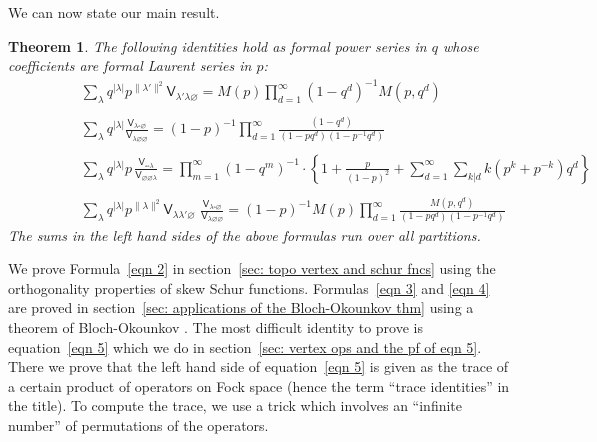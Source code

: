 \documentclass[12pt]{amsart}
\newcommand{\Vsf}{\mathsf{V}}
\newcommand{\bx}{\square}
\renewcommand{\emptyset}{\varnothing}
\newtheorem{theorem}{Theorem}%
\theoremstyle{definition}
\begin{document}
We can now state our main result.

\begin{theorem}\label{thm: main formulas}
The following identities hold as formal power series in $q$ whose
coefficients are formal Laurent series in $p$:
\begin{align}
&\sum_{\lambda} q^{|\lambda |} p^{\| \lambda' \| ^{2}} \Vsf_{\lambda'
\lambda \emptyset }=  M(p) \prod_{d=1}^{\infty} (1-q^{d})^{-1}M(p,q^{d})\label{eqn 2}\\
\quad\nonumber \\
&\sum_{\lambda} q^{|\lambda |}\frac{\Vsf_{\lambda
\bx\emptyset}}{\Vsf_{\lambda \emptyset \emptyset}} =
(1-p)^{-1}\prod_{d=1}^{\infty} \frac{(1-q^{d})}{(1-pq^{d})(1-p^{-1}q^{d})}\label{eqn 3}\\
\quad\nonumber \\
&\sum_{\lambda} q^{|\lambda |} p \, \frac{\Vsf_{\bx \bx 
\lambda}}{\Vsf_{\emptyset \emptyset \lambda}} =
\prod_{m=1}^{\infty}(1-q^{m})^{-1}\cdot \left\{
1+\frac{p}{(1-p)^{2}}+\sum_{d=1}^{\infty}\sum_{k|d}k(p^{k}+p^{-k})q^{d}\right\}\label{eqn 4}\\
\quad&\quad \nonumber \\
\quad \quad \quad \quad &\sum_{\lambda} q^{|\lambda |} p^{\| \lambda \| ^{2}}
\Vsf_{\lambda \lambda' \emptyset} \,\,\frac{\Vsf_{\lambda \bx \emptyset}}{\Vsf_{\lambda \emptyset
\emptyset}} =
(1-p)^{-1}M(p)\prod_{d=1}^{\infty}
\frac{M(p,q^{d})}{(1-pq^{d})(1-p^{-1}q^{d})}\label{eqn 5}
\end{align}
The sums in the left hand sides of the above formulas run over all
partitions. 
\end{theorem}





We prove Formula~\eqref{eqn 2} in section~\ref{sec: topo vertex and
schur fncs} using the orthogonality properties of skew Schur
functions. Formulas~\eqref{eqn 3} and \eqref{eqn 4} are proved in
section~\ref{sec: applications of the Bloch-Okounkov thm} using a
theorem of Bloch-Okounkov \cite{Bloch-Okounkov}. The most difficult
identity to prove is equation~\eqref{eqn 5} which we do in
section~\ref{sec: vertex ops and the pf of eqn 5}. There we prove that
the left hand side of equation~\eqref{eqn 5} is given as the trace of
a certain product of operators on Fock space (hence the term ``trace identities'' in the title). To compute the trace, we
use a trick which involves an ``infinite number'' of permutations of
the operators.
\end{document}
